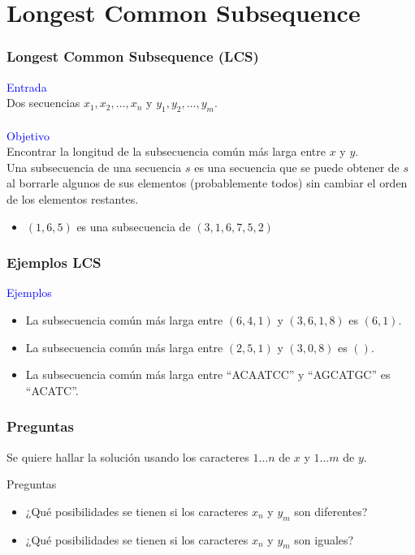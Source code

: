 \documentclass{beamer}
\begin{document}
\section[LCS]{Longest Common Subsequence}

	\begin{frame}
		\frametitle{Longest Common Subsequence (LCS)}
		\textcolor{blue}{\large Entrada}\\
		Dos secuencias $x_1, x_2, \ldots, x_n$ y $y_1, y_2, \ldots, y_m$.\\ \quad \\
		\textcolor{blue}{\large Objetivo}\\
		Encontrar la longitud de la subsecuencia común más larga entre $x$ y $y$.\\
		Una subsecuencia de una secuencia $s$ es una secuencia que se puede obtener de $s$ al borrarle algunos de sus elementos (probablemente todos) sin cambiar el orden de los elementos restantes.\\ 
		\begin{itemize}
			\item $(1, 6, 5)$ es una subsecuencia de $(3, 1, 6, 7, 5, 2)$
		\end{itemize}
	\end{frame}
	
	\begin{frame}
		\frametitle{Ejemplos LCS}
		\textcolor{blue}{\large Ejemplos}\\
		\begin{itemize}
			\item La subsecuencia común más larga entre $(6, 4, 1)$ y $(3, 6, 1, 8)$ es $(6, 1)$.
			\item La subsecuencia común más larga entre $(2, 5, 1)$ y $(3, 0, 8)$ es $()$.
			\item La subsecuencia común más larga entre ``ACAATCC'' y ``AGCATGC'' es ``ACATC''.
		\end{itemize}
	\end{frame}

	\begin{frame}
		\frametitle{Preguntas}
		Se quiere hallar la solución usando los caracteres $1 \ldots n$ de $x$ y $1 \ldots m$ de $y$.
		\begin{alertblock}{Preguntas}
			\begin{itemize}
				\item ¿Qué posibilidades se tienen si los caracteres $x_n$ y $y_m$ son diferentes?
				\item ¿Qué posibilidades se tienen si los caracteres $x_n$ y $y_m$ son iguales?
			\end{itemize}
		\end{alertblock}
	\end{frame}
	
\end{document}
